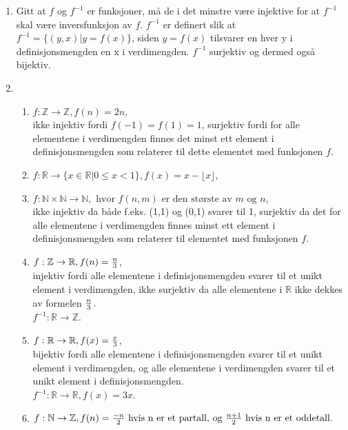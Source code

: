\documentclass[a4paper, 12pt]{article}  %
\begin{document}
\begin{enumerate}
    \item [\boxed{5}]
    Gitt at \(f\) og \(f^{-1}\) er funksjoner, må de i det minstre være injektive for at \(f^{-1}\) skal være inversfunksjon av \(f\).
    \(f^{-1}\) er definert slik at \(f^{-1} = \{(y,x)|y=f(x)\}\), siden \(y=f(x)\) tilsvarer en hver y i definisjonsmengden en x i verdimengden. 
    \(f^{-1}\) surjektiv og dermed også bijektiv.
    
    \item [\boxed{6}] 
    \begin{enumerate}
        \item \(f:\mathbb{Z} \rightarrow \mathbb{Z}, f(n)=2n\), 
        \\ikke injektiv fordi \(f(-1)=f(1)=1\), surjektiv fordi for alle elementene i verdimengden finnes det minst ett element i definisjonsmengden som relaterer til dette elementet med funksjonen \(f\).
        \item \(f:\mathbb{R}\rightarrow\{x\in\mathbb{R}|0\leqslant x < 1\}, f(x) = x - \lfloor x\rfloor \),
        \\
        \item \(f:\mathbb{N}\times\mathbb{N}\rightarrow\mathbb{N}, \text{ hvor } f(n, m) \text{ er den største av } m \text{ og } n\),
        \\ikke injektiv da både f.eks. (1,1) og (0,1) svarer til 1, surjektiv da det for alle elementene i verdimengden finnes minst ett element i definisjonsmengden som relaterer til elementet med funksjonen \(f\).
        \item \(f:\mathbb{Z}\rightarrow\mathbb{R}, f(n)={n\over 3}\),
        \\injektiv fordi alle elementene i definisjonsmengden svarer til et unikt element i verdimengden, ikke surjektiv da alle elementene i \(\mathbb{R}\) ikke dekkes av formelen \({n\over 3}\).
        \\\(f^{-1}:\mathbb{R}\rightarrow\mathbb{Z}\).
        \item \(f:\mathbb{R}\rightarrow\mathbb{R}, f(x)={x\over3}\),
        \\bijektiv fordi alle elementene i definisjonsmengden svarer til et unikt element i verdimengden, og alle elementene i verdimengden svarer til et unikt element i definisjonsmengden.
        \\\(f^{-1}:\mathbb{R}\rightarrow\mathbb{R}, f(x) = 3x\).
        \item \(f:\mathbb{N}\rightarrow\mathbb{Z}, f(n)={-n\over2} \text{ hvis n er et partall, og } \frac{n+1}{2} \text{ hvis n er et oddetall.}\)

\end{enumerate}
\end{enumerate}
\end{document}
